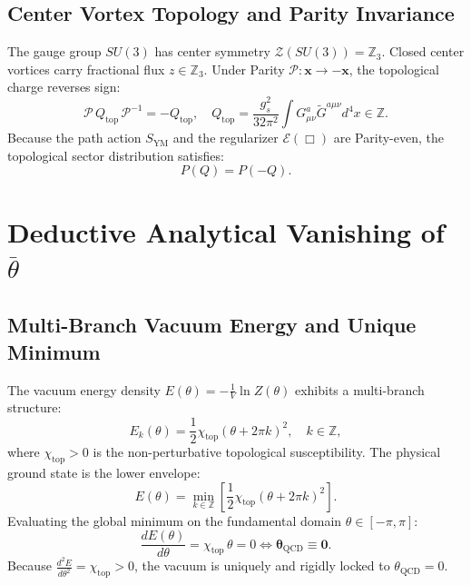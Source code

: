 \documentclass[11pt,a4paper]{article}
\begin{document}
\subsection{Center Vortex Topology and Parity Invariance}
The gauge group $SU(3)$ has center symmetry $\mathcal{Z}(SU(3)) = \mathbb{Z}_3$. Closed center vortices carry fractional flux $z \in \mathbb{Z}_3$. Under Parity $\mathcal{P}: \mathbf{x} \to -\mathbf{x}$, the topological charge reverses sign:
\begin{equation}
\mathcal{P} \, Q_{\mathrm{top}} \, \mathcal{P}^{-1} = - Q_{\mathrm{top}}, \quad Q_{\mathrm{top}} = \frac{g_s^2}{32\pi^2}\int G_{\mu\nu}^a \tilde{G}^{a\mu\nu} d^4x \in \mathbb{Z}.
\end{equation}
Because the path action $S_{\mathrm{YM}}$ and the regularizer $\mathcal{E}(\Box)$ are Parity-even, the topological sector distribution satisfies:
\begin{equation}
P(Q) = P(-Q).
\end{equation}

\section{Deductive Analytical Vanishing of $\bar{\theta}$}

\subsection{Multi-Branch Vacuum Energy and Unique Minimum}
The vacuum energy density $E(\theta) = -\frac{1}{V}\ln Z(\theta)$ exhibits a multi-branch structure:
\begin{equation}
E_k(\theta) = \frac{1}{2} \chi_{\mathrm{top}} (\theta + 2\pi k)^2, \quad k \in \mathbb{Z},
\end{equation}
where $\chi_{\mathrm{top}} > 0$ is the non-perturbative topological susceptibility. The physical ground state is the lower envelope:
\begin{equation}
E(\theta) = \min_{k \in \mathbb{Z}} \left[ \frac{1}{2} \chi_{\mathrm{top}} (\theta + 2\pi k)^2 \right].
\end{equation}
Evaluating the global minimum on the fundamental domain $\theta \in [-\pi, \pi]$:
\begin{equation}
\frac{d E(\theta)}{d\theta} = \chi_{\mathrm{top}} \, \theta = 0 \iff \mathbf{\theta_{\mathrm{QCD}} \equiv 0}.
\end{equation}
Because $\frac{d^2 E}{d\theta^2} = \chi_{\mathrm{top}} > 0$, the vacuum is uniquely and rigidly locked to $\theta_{\mathrm{QCD}} = 0$.
\end{document}
